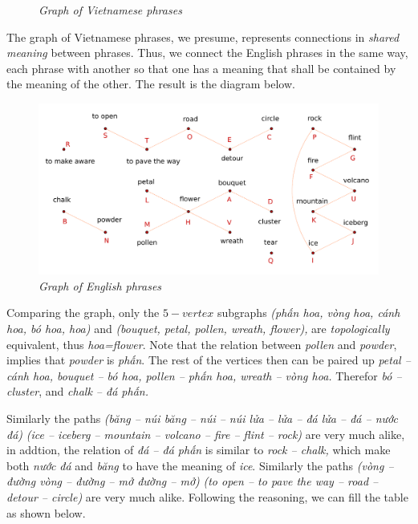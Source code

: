 \begin{multicols}{2}
\begin{figure}[H]
		\caption{\small\textit{\color{toancuabi}Graph of Vietnamese phrases}}
		\vspace*{-10pt}
	\end{figure}
	The graph of Vietnamese phrases, we presume, represents connections in \textit{shared meaning} between phrases.
	Thus, we connect the English phrases in the same way,
	each phrase with another so that one has a meaning that shall be contained by the meaning of the other.
	The result is the diagram below.
	\begin{figure}[H]
		\vspace*{-5pt}
		\centering
		\captionsetup{labelformat= empty, justification=centering}
		\includegraphics[width= 1\linewidth]{hc-2022-2-2-2-2.pdf}
		\caption{\small\textit{\color{toancuabi}Graph of English phrases}}
		\vspace*{-10pt}
	\end{figure}
	Comparing the graph, only the $5-vertex$ subgraphs \textit{(phấn hoa, vòng hoa, cánh hoa, bó hoa, hoa)} and
	\textit{(bouquet, petal, pollen, wreath, flower),} are \textit{topologically} equivalent, thus \textit{hoa=flower}.
	Note that the relation between \textit{pollen} and \textit{powder},
	implies that \textit{powder} is \textit{phấn}. The rest of the vertices then can be paired up
	\textit{petal -- cánh hoa, bouquet -- bó hoa, pollen -- phấn hoa, wreath -- vòng hoa.}
	Therefor \textit{bó -- cluster}, and \textit{chalk -- đá phấn.}
	
	Similarly the paths \textit{(băng -- núi băng -- núi -- núi lửa -- lửa -- đá lửa -- đá -- nước đá)} 
	\textit{(ice -- iceberg -- mountain -- volcano -- fire -- flint -- rock)} are very much alike,
	in addtion, the relation of \textit{đá -- đá phấn} is similar to \textit{rock -- chalk,}
	which make both \textit{nước đá} and \textit{băng} to have the meaning of \textit{ice}.
	Similarly the paths \textit{(vòng -- đường vòng -- đường -- mở đường -- mở)} 
	\textit{(to open -- to pave the way -- road -- detour -- circle)} are very much alike.
	\vskip 0.1cm
	Following the reasoning, we can fill the table as shown below.
\end{multicols}
